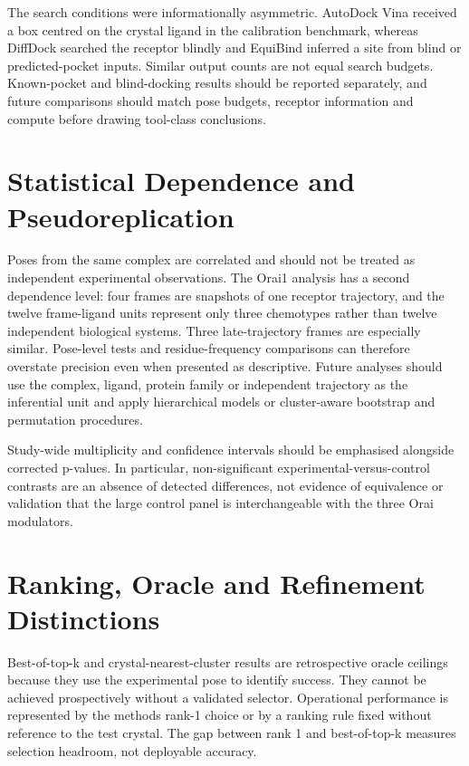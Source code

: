 The search conditions were informationally asymmetric. AutoDock Vina received a box centred on the crystal ligand in the calibration benchmark, whereas DiffDock searched the receptor blindly and EquiBind inferred a site from blind or predicted-pocket inputs. Similar output counts are not equal search budgets. Known-pocket and blind-docking results should be reported separately, and future comparisons should match pose budgets, receptor information and compute before drawing tool-class conclusions.

\hypertarget{statistical-dependence-and-pseudoreplication}{%
\section{Statistical Dependence and Pseudoreplication}\label{statistical-dependence-and-pseudoreplication}}

Poses from the same complex are correlated and should not be treated as independent experimental observations. The Orai1 analysis has a second dependence level: four frames are snapshots of one receptor trajectory, and the twelve frame-ligand units represent only three chemotypes rather than twelve independent biological systems. Three late-trajectory frames are especially similar. Pose-level tests and residue-frequency comparisons can therefore overstate precision even when presented as descriptive. Future analyses should use the complex, ligand, protein family or independent trajectory as the inferential unit and apply hierarchical models or cluster-aware bootstrap and permutation procedures.

Study-wide multiplicity and confidence intervals should be emphasised alongside corrected p-values. In particular, non-significant experimental-versus-control contrasts are an absence of detected differences, not evidence of equivalence or validation that the large control panel is interchangeable with the three Orai modulators.

\hypertarget{ranking-oracle-and-refinement-distinctions}{%
\section{Ranking, Oracle and Refinement Distinctions}\label{ranking-oracle-and-refinement-distinctions}}

Best-of-top-k and crystal-nearest-cluster results are retrospective oracle ceilings because they use the experimental pose to identify success. They cannot be achieved prospectively without a validated selector. Operational performance is represented by the method\textquotesingle s rank-1 choice or by a ranking rule fixed without reference to the test crystal. The gap between rank 1 and best-of-top-k measures selection headroom, not deployable accuracy.

